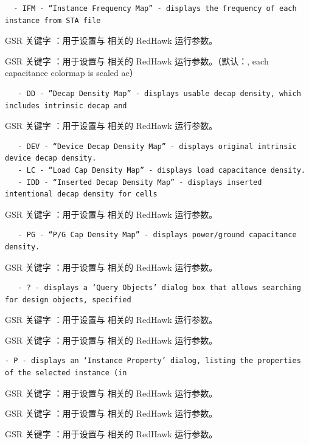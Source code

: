 \begin{lstlisting}
  - IFM - “Instance Frequency Map” - displays the frequency of each instance from STA file
\end{lstlisting}

GSR 关键字 ：用于设置与  相关的 RedHawk 运行参数。

GSR 关键字 ：用于设置与  相关的 RedHawk 运行参数。（默认：, each capacitance colormap is scaled ac）

\begin{lstlisting}
   - DD - ”Decap Density Map” - displays usable decap density, which includes intrinsic decap and
\end{lstlisting}

GSR 关键字 ：用于设置与  相关的 RedHawk 运行参数。

\begin{lstlisting}
   - DEV - “Device Decap Density Map” - displays original intrinsic device decap density.
   - LC - “Load Cap Density Map” - displays load capacitance density.
   - IDD - “Inserted Decap Density Map” - displays inserted intentional decap density for cells
\end{lstlisting}

GSR 关键字 ：用于设置与  相关的 RedHawk 运行参数。

\begin{lstlisting}
   - PG - “P/G Cap Density Map” - displays power/ground capacitance density.
\end{lstlisting}

GSR 关键字 ：用于设置与  相关的 RedHawk 运行参数。

\begin{lstlisting}
   - ? - displays a ‘Query Objects’ dialog box that allows searching for design objects, specified
\end{lstlisting}

GSR 关键字 ：用于设置与  相关的 RedHawk 运行参数。

GSR 关键字 ：用于设置与  相关的 RedHawk 运行参数。

\begin{lstlisting}
- P - displays an ‘Instance Property’ dialog, listing the properties of the selected instance (in
\end{lstlisting}

GSR 关键字 ：用于设置与  相关的 RedHawk 运行参数。

GSR 关键字 ：用于设置与  相关的 RedHawk 运行参数。

GSR 关键字 ：用于设置与  相关的 RedHawk 运行参数。

